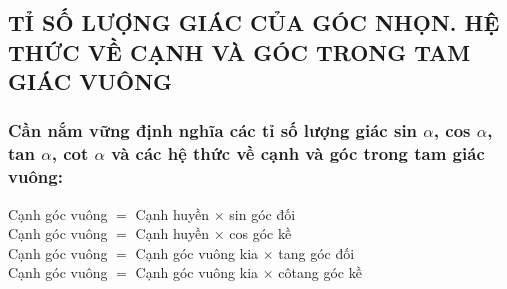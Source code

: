 \subsection{TỈ SỐ LƯỢNG GIÁC CỦA GÓC NHỌN. HỆ THỨC VỀ CẠNH VÀ GÓC TRONG TAM GIÁC VUÔNG}
\subsubsection{Cần nắm vững định nghĩa các tỉ số lượng giác sin $ \alpha $, cos $ \alpha $, tan $ \alpha $, cot $\alpha$ và các hệ thức về cạnh và góc trong tam giác vuông:}
Cạnh góc vuông $ = $ Cạnh huyền $ \times $ sin góc đối\\
Cạnh góc vuông $ = $ Cạnh huyền $ \times $ cos góc kề\\
Cạnh góc vuông $ = $ Cạnh góc vuông kia $ \times $ tang góc đối\\
Cạnh góc vuông $ = $ Cạnh góc vuông kia $ \times $ côtang góc kề
